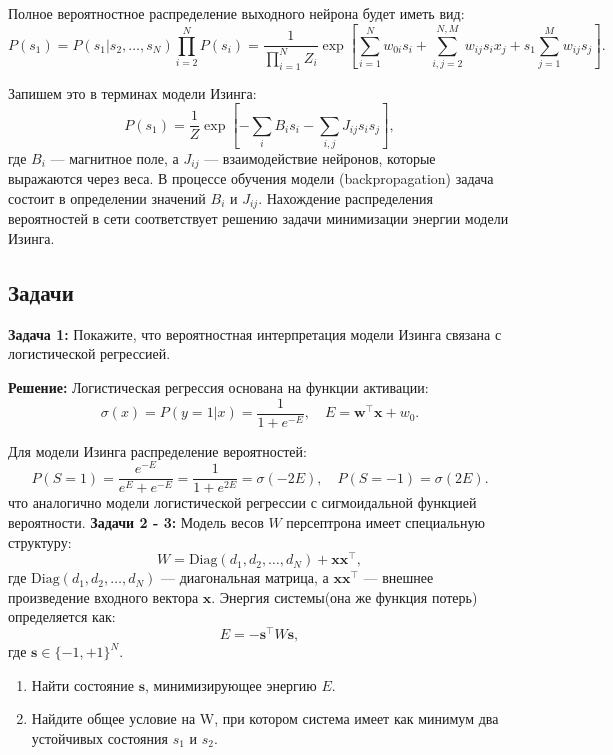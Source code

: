 \begin{description}
	      Полное вероятностное распределение выходного нейрона будет иметь вид:
	      \[
		      P(s_1) = P(s_1 | s_2, \dots, s_N) \prod_{i=2}^N P(s_i) = \frac{1}{\prod_{i=1}^N Z_i} \exp\left[ \sum_{i=1}^N w_{0i} s_i + \sum_{i,j=2}^{N,M} w_{ij} s_i x_j + s_1 \sum_{j=1}^M w_{ij} s_j \right].
	      \]

	      Запишем это в терминах модели Изинга:
	      \[
		      P(s_1) = \frac{1}{Z} \exp\left[-\sum_i B_i s_i - \sum_{i,j} J_{ij} s_i s_j \right],
	      \]
	      где $B_i$ — магнитное поле, а $J_{ij}$ — взаимодействие нейронов, которые выражаются через веса. В процессе обучения модели (backpropagation) задача состоит в определении значений $B_i$ и $J_{ij}$.
	      Нахождение распределения вероятностей в сети соответствует решению задачи минимизации энергии модели Изинга.

	      \subsection{Задачи}
	      \textbf{Задача 1:} Покажите, что вероятностная интерпретация модели Изинга связана с логистической регрессией.

	      \textbf{Решение:}
	      Логистическая регрессия основана на функции активации:
	      \[
		      \sigma(x) = P(y=1 | x) = \frac{1}{1 + e^{-E}}, \quad E = \mathbf{w}^\top \mathbf{x} + w_0.
	      \]

	      Для модели Изинга распределение вероятностей:
	      \[
		      P(S = 1) = \frac{e^{-E}}{e^{E} + e^{-E}} = \frac{1}{1+ e^{2E}} =  \sigma(-2E),\quad P(S = -1) = \sigma(2E).
	      \]
	      что аналогично модели логистической регрессии с сигмоидальной функцией вероятности.
	      \textbf{Задачи 2 - 3:}
	      Модель весов \( W \) персептрона имеет специальную структуру:
	      \[
		      W = \text{Diag}(d_1, d_2, \dots, d_N) + \mathbf{x} \mathbf{x}^\top,
	      \]
	      где \( \text{Diag}(d_1, d_2, \dots, d_N) \) — диагональная матрица, а \( \mathbf{x} \mathbf{x}^\top \) — внешнее произведение входного вектора \( \mathbf{x} \). Энергия системы(она же функция потерь) определяется как:
	      \[
		      E = -\mathbf{s}^\top W \mathbf{s},
	      \]
	      где \( \mathbf{s} \in \{-1, +1\}^N \).

	      \begin{enumerate}
		      \item Найти состояние \( \mathbf{s} \), минимизирующее энергию \( E \).
		      \item Найдите общее условие на W, при котором система имеет как минимум два устойчивых состояния $s_1$ и $s_2$.
	      \end{enumerate}


\end{description}
